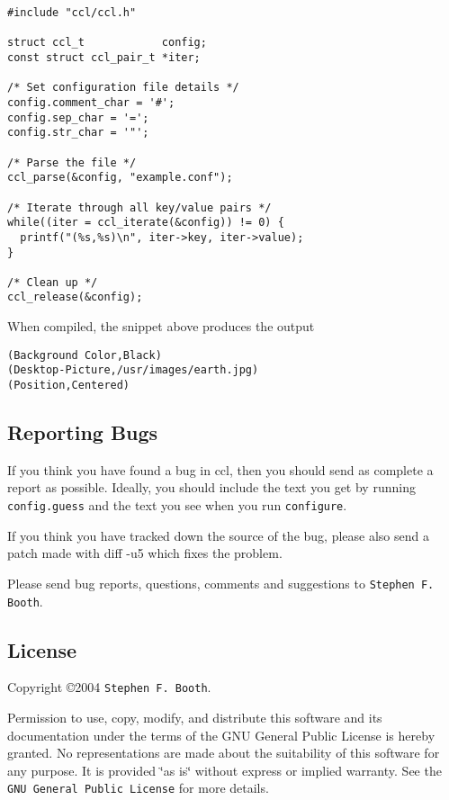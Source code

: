 \footnotesize\begin{verbatim}#include "ccl/ccl.h"

struct ccl_t            config;
const struct ccl_pair_t *iter;

/* Set configuration file details */
config.comment_char = '#';
config.sep_char = '=';
config.str_char = '"';

/* Parse the file */
ccl_parse(&config, "example.conf");

/* Iterate through all key/value pairs */
while((iter = ccl_iterate(&config)) != 0) {
  printf("(%s,%s)\n", iter->key, iter->value);
}

/* Clean up */
ccl_release(&config);
\end{verbatim}
\normalsize


When compiled, the snippet above produces the output



\footnotesize\begin{verbatim}(Background Color,Black)
(Desktop-Picture,/usr/images/earth.jpg)
(Position,Centered)
\end{verbatim}
\normalsize
\subsection{Reporting Bugs}\label{index_section_bugs}
If you think you have found a bug in ccl, then you should send as complete a report as possible. Ideally, you should include the text you get by running {\tt config.guess} and the text you see when you run {\tt configure}.

If you think you have tracked down the source of the bug, please also send a patch made with diff -u5 which fixes the problem.

Please send bug reports, questions, comments and suggestions to {\tt Stephen F. Booth}.\subsection{License}\label{index_section_license}
Copyright \copyright 2004 {\tt Stephen F. Booth}.

Permission to use, copy, modify, and distribute this software and its documentation under the terms of the GNU General Public License is hereby granted. No representations are made about the suitability of this software for any purpose. It is provided \char`\"{}as is\char`\"{} without express or implied warranty. See the {\tt GNU General Public License} for more details. 